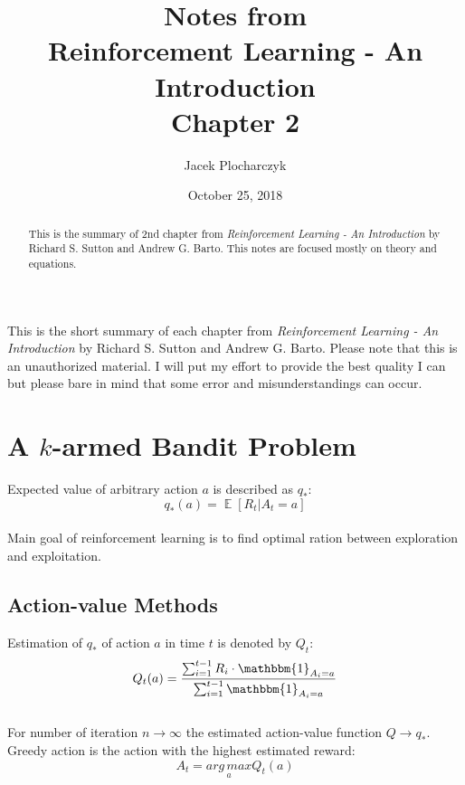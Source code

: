 \documentclass[12pt]{article}
\author{Jacek Plocharczyk}
\date{October 25, 2018}
\title{Notes from \\Reinforcement Learning - An Introduction\\Chapter 2 }
\DeclareMathOperator{\EX}{\mathbb{E}}%
\begin{document}
    \maketitle
    \vfill 
    {\centering This is the short summary of each chapter from \textit{Reinforcement Learning - An Introduction} by Richard S. Sutton and Andrew G. Barto.
    Please note that this is an unauthorized material. I will put my effort to provide the best quality I can but please bare in mind that some error and misunderstandings can occur.\par}
    \newpage


    \begin{abstract}

     This is the summary of 2nd chapter from \textit{Reinforcement Learning - An Introduction} 
     by Richard S. Sutton and Andrew G. Barto.
     This notes are focused mostly on theory and equations.

    \end{abstract}  


    \newpage
    \section{A $k$-armed Bandit Problem}
    Expected value of arbitrary action $a$ is described as $q_*$:
    \begin{equation}
        q_*(a) = \EX[R_t|A_t=a]
    \end{equation}
    \\
    Main goal of reinforcement learning is to find optimal ration between exploration and exploitation.


    \subsection{Action-value Methods}
    Estimation of $q_*$ of action $a$ in time $t$ is denoted by $Q_t$:
    \begin{equation}
        Q_t(a) = \frac{\sum_{i=1}^{t-1}R_i \cdot \mathbbm{1}_{A_i=a}}{\sum_{i=1}^{t-1}\mathbbm{1}_{A_i=a}}
    \end{equation}
    \\
    For number of iteration $n \rightarrow \infty$ the estimated action-value function
     $ Q \rightarrow q_*$.
    \vspace{0.3cm}
    \\Greedy action is the action with the highest estimated reward:
    \begin{equation}
        A_t = \underset{a}{arg\,max}Q_t(a)
    \end{equation}
\end{document}
